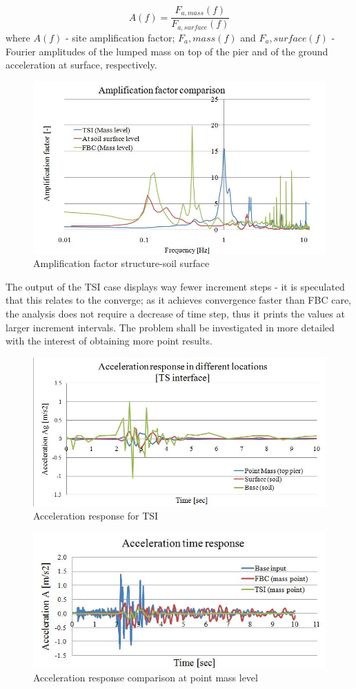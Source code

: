 	\begin{equation}
	A(f)=\frac{F_{a,mass}(f)}{F_{a,surface}(f)}
	\end{equation}
	where $A(f)$ - site amplification factor; $F_a,mass(f)$ and $F_a,surface(f)$ - Fourier amplitudes of the lumped mass on top of the pier and of the ground acceleration at surface, respectively. 

\begin{figure}[!h]
	\centering
	\includegraphics[width=0.7\linewidth]{"amplification"}
	\caption{Amplification factor structure-soil surface}
	\label{ampli}
\end{figure}

The output of the TSI case displays way fewer increment steps - it is speculated that this relates to the converge; as it achieves convergence faster than FBC care, the analysis does not require a decrease of time step, thus it prints the values at larger increment intervals. The problem shall be investigated in more detailed with the interest of obtaining more point results.

\begin{figure}[!h]
	\centering
	\includegraphics[width=0.7\linewidth]{"acc_TSI"}
	\caption{Acceleration response for TSI}
	\label{TSIacc}
\end{figure}

\begin{figure}[!h]
	\centering
	\includegraphics[width=0.7\linewidth]{"acc_FBC"}
	\caption{Acceleration response comparison at point mass level}
	\label{FBCacc}
\end{figure}

